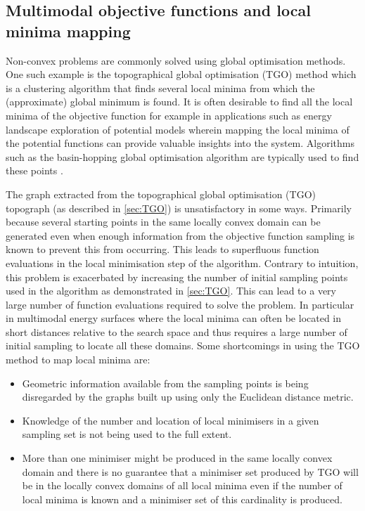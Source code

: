 \subsection{Multimodal objective functions and local minima mapping}
Non-convex problems are commonly solved using global optimisation methods. One such example is the topographical global optimisation (TGO) method \cite{Henderson2015, Torn1986, Torn1990, Torn1992} which is a clustering algorithm that finds several local minima from which the (approximate) global minimum is found. It is often desirable to find all the local minima of the objective function for example in applications such as energy landscape exploration of potential models wherein mapping the local minima of the potential functions can provide valuable insights into the system. Algorithms such as the basin-hopping global optimisation algorithm are typically used to find these points \citep{Wales2015}.





The graph extracted from the topographical global optimisation (TGO) \cite{Henderson2015, Torn1986, Torn1990, Torn1992} topograph (as described in \autoref{sec:TGO}) is unsatisfactory in some ways. Primarily because several starting points in the same locally convex domain can be generated even when enough information from the objective function sampling is known to prevent this from occurring. This leads to superfluous function evaluations in the local minimisation step of the algorithm. Contrary to intuition, this problem is exacerbated by increasing the number of initial sampling points used in the algorithm as demonstrated in \autoref{sec:TGO}. This can lead to a very large number of function evaluations required to solve the problem. In particular in multimodal energy surfaces where the local minima can often be located in short distances relative to the search space \cite{Zhang2011} and thus requires a large number of initial sampling to locate all these domains. Some shortcomings in using the TGO method to map local minima are:
\begin{itemize}
\item Geometric information available from the sampling points is being disregarded by the graphs built up using only the Euclidean distance metric.
\item Knowledge of the number and location of local minimisers in a given sampling set is not being used to the full extent.
\item More than one minimiser might be produced in the same locally convex domain and there is no guarantee that a minimiser set produced by TGO will be in the locally convex domains of all local minima even if the number of local minima is known and a minimiser set of this cardinality is produced.
\end{itemize}

